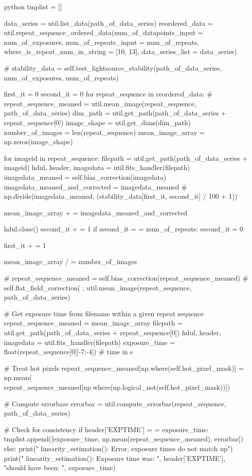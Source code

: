 \documentclass[../main.tex]{subfiles}
\begin{document}
\begin{mintedbox}{python}
tmplist  =  []

data_series  =  util.list_data(path_of_data_series)
reordered_data  =  util.repeat_sequence_ordered_data(num_of_datapoints_input = num_of_exposures,
num_of_repeats_input = num_of_repeats,
where_is_repeat_num_in_string = [10, 13],
data_series_list = data_series)

# stability_data      =    self.test_lightsource_stability(path_of_data_series, num_of_exposures, num_of_repeats)

first_it  =  0
second_it  =  0
for repeat_sequence in reordered_data:
# repeat_sequence_meaned       =    util.mean_image(repeat_sequence, path_of_data_series)
dim_path  =  util.get_path(path_of_data_series + repeat_sequence[0])
image_shape  =  util.get_dims(dim_path)
number_of_images  =  len(repeat_sequence)
mean_image_array  =  np.zeros(image_shape)

for imageid in repeat_sequence:
filepath  =  util.get_path(path_of_data_series + imageid)
hdul, header, imagedata  =  util.fits_handler(filepath)
imagedata_meaned  =  self.bias_correction(imagedata)
imagedata_meaned_and_corrected  =  imagedata_meaned  # np.divide(imagedata_meaned, (stability_data[first_it, second_it] / 100 + 1))

mean_image_array + =  imagedata_meaned_and_corrected

hdul.close()
second_it + =  1
if second_it  =  =  num_of_repeats:
second_it  =  0

first_it + =  1

mean_image_array / =  number_of_images

# repeat_sequence_meaned       =    self.bias_correction(repeat_sequence_meaned)  # self.flat_field_correction(  ,   util.mean_image(repeat_sequence, path_of_data_series)

# Get exposure time from filename within a given repeat sequence
repeat_sequence_meaned  =  mean_image_array
filepath  =  util.get_path(path_of_data_series + repeat_sequence[0])
hdul, header, imagedata  =  util.fits_handler(filepath)
exposure_time  =  float(repeat_sequence[0][-7:-4])  # time in s

# Treat hot pixels
repeat_sequence_meaned[np.where(self.hot_pixel_mask)]  =  np.mean(
repeat_sequence_meaned[np.where(np.logical_not(self.hot_pixel_mask))])

# Compute errorbars
errorbar  =  util.compute_errorbar(repeat_sequence, path_of_data_series)

# Check for consistency
if header['EXPTIME']  =  =  exposure_time:
tmplist.append([exposure_time, np.mean(repeat_sequence_meaned), errorbar])
else:
print("  linearity_estimation(): Error, exposure times do not match up")
print("  linearity_estimation(): Exposure time was: ", header['EXPTIME'], "should have been: ",
exposure_time)


\end{mintedbox}
\end{document}
